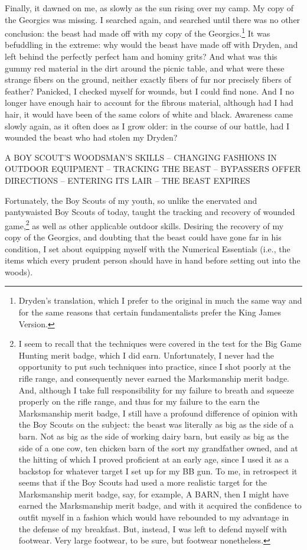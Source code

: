 \par
Finally, it dawned on me, as slowly as the sun rising over my camp.  My copy of the Georgics was missing.  I searched again, and searched until there was no other conclusion: the beast had made off with my copy of the Georgics.\footnote{Dryden's translation, which I prefer to the original in much the same way and for the same reasons that certain fundamentalists prefer the King James Version.}  It was befuddling in the extreme: why would the beast have made off with Dryden, and left behind the perfectly perfect ham and hominy grits?  And what was this gummy red material in the dirt around the picnic table, and what were these strange fibers on the ground, neither exactly fibers of fur nor precisely fibers of feather?  Panicked, I checked myself for wounds, but I could find none.  And I no longer have enough hair to account for the fibrous material, although had I had hair, it would have been of the same colors of white and black.  Awareness came slowly again, as it often does as I grow older: in the course of our battle, had I wounded the beast who had stolen my Dryden?
\newpage
\par
\begin{center}
A BOY SCOUT'S WOODSMAN'S SKILLS – CHANGING FASHIONS IN OUTDOOR EQUIPMENT – TRACKING THE BEAST – BYPASSERS OFFER DIRECTIONS – ENTERING ITS LAIR – THE BEAST EXPIRES
\end{center}
\par
Fortunately, the Boy Scouts of my youth, so unlike the enervated and pantywaisted Boy Scouts of today, taught the tracking and recovery of wounded game,\footnote{I seem to recall that the techniques were covered in the test for the Big Game Hunting merit badge, which I did earn.  Unfortunately, I never had the opportunity to put such techniques into practice, since I shot poorly at the rifle range, and consequently never earned the Marksmanship merit badge.  And, although I take full responsibility for my failure to breath and squeeze properly on the rifle range, and thus for my failure to the earn the Marksmanship merit badge, I still have a profound difference of opinion with the Boy Scouts on the subject: the beast was literally as big as the side of a barn.  Not as big as the side of working dairy barn, but easily as big as the side of a one cow, ten chicken barn of the sort my grandfather owned, and at the hitting of which I proved proficient at an early age, since I used it as a backstop for whatever target I set up for my BB gun.  To me, in retrospect it seems that if the Boy Scouts had used a more realistic target for the Marksmanship merit badge, say, for example, A BARN, then I might have earned the Marksmanship merit badge, and with it acquired the confidence to outfit myself in a fashion which would have rebounded to my advantage in the defense of my breakfast.  But, instead, I was left to defend myself with footwear.  Very large footwear, to be sure, but footwear nonetheless.} as well as other applicable outdoor skills.  Desiring the recovery of my copy of the Georgics, and doubting that the beast could have gone far in his condition, I set about equipping myself with the Numerical Essentials (i.e., the items which every prudent person should have in hand before setting out into the woods).
